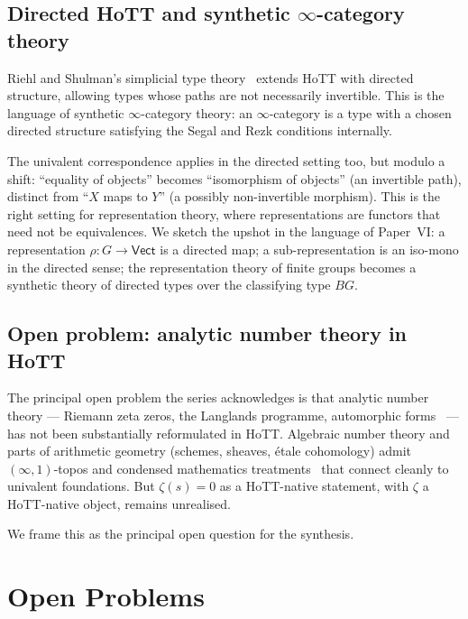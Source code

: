 \documentclass[12pt]{article}
\theoremstyle{definition}
\theoremstyle{remark}
\begin{document}
\subsection{Directed HoTT and synthetic \texorpdfstring{$\infty$}{Infinity}-category theory}
\label{sec:directed}

Riehl and Shulman's simplicial type theory~\cite{RiehlShulman} extends
HoTT with directed structure, allowing types whose paths are not
necessarily invertible. This is the language of synthetic
$\infty$-category theory: an $\infty$-category is a type with a chosen
directed structure satisfying the Segal and Rezk conditions internally.

The univalent correspondence applies in the directed setting too, but
modulo a shift: ``equality of objects'' becomes ``isomorphism of objects''
(an invertible path), distinct from ``$X$ maps to $Y$'' (a possibly
non-invertible morphism). This is the right setting for
representation theory, where representations are functors that need not
be equivalences. We sketch the upshot in the language of Paper~VI: a
representation $\rho\colon G \to \mathsf{Vect}$ is a directed map; a
sub-representation is an iso-mono in the directed sense; the
representation theory of finite groups becomes a synthetic theory of
directed types over the classifying type $BG$.

\subsection{Open problem: analytic number theory in HoTT}
\label{sec:open-langlands}

The principal open problem the series acknowledges is that analytic number
theory --- Riemann zeta zeros, the Langlands programme, automorphic
forms~\cite{lurie} --- has not been substantially reformulated in HoTT.
Algebraic number theory and parts of arithmetic geometry (schemes, sheaves,
\'etale cohomology) admit $(\infty,1)$-topos and condensed mathematics
treatments~\cite{ShulmanInftyTopos} that connect cleanly to univalent
foundations. But $\zeta(s) = 0$ as a HoTT-native statement, with $\zeta$ a
HoTT-native object, remains unrealised.

We frame this as the principal open question for the synthesis.

\section{Open Problems}
\label{sec:open}
\end{document}
